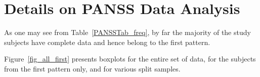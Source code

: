 \documentclass[11pt,a5paper,twoside]{book}
\begin{document}
{\section{Details on PANSS Data Analysis}\label{suppdata}
\vspace{-3.5mm}
As one may see from Table~\ref{PANSSTab_freq}, by far the majority of the study subjects have complete data and hence belong to the first pattern.

 Figure~\ref{fig_all_first} presents boxplots for the entire set of data, for the subjects from the first pattern only, and for various split samples. 


\begin{table}[ht!]
\centering
\caption{PANSS data. Number of clusters in each trial for each cluster pattern.}
\label{PANSSTab_freq}\vspace*{2mm}
\end{table}}
\end{document}
